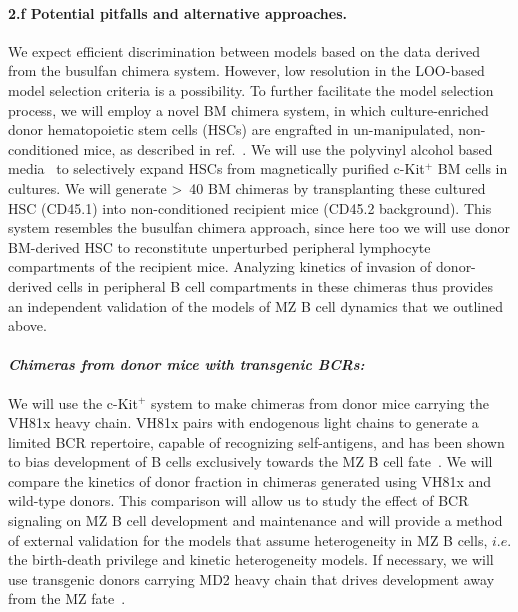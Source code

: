 \documentclass[11pt]{article}
\newcommand\ie{$\textit{i.e.}$}
\newcommand{\para}[1]{\vspace*{-4.5mm}\paragraph{#1}}
\begin{document}
\para{2.f Potential pitfalls and alternative approaches.}
We expect efficient discrimination between models based on the data derived from the busulfan chimera system.
However, low resolution in the LOO-based model selection criteria is a possibility.
To further facilitate the model selection process, we will employ a novel BM chimera system, in which culture-enriched donor hematopoietic stem cells (HSCs) are engrafted in un-manipulated, non-conditioned mice, as described in ref.~.
We will use the polyvinyl alcohol based media~\cite{Wilkinson_2020} to selectively expand HSCs from magnetically purified c-Kit$^+$ BM cells in cultures.
We will generate >~40 BM chimeras by transplanting these cultured HSC (CD45.1) into non-conditioned recipient mice (CD45.2 background).
This system resembles the busulfan chimera approach, since here too we will use donor BM-derived HSC to reconstitute {unperturbed peripheral lymphocyte compartments} of the recipient mice.
Analyzing kinetics of invasion of donor-derived cells in peripheral B cell compartments in these chimeras thus provides an {independent validation} of the models of MZ B cell dynamics that we outlined above.

\para{\textit{Chimeras from donor mice with transgenic BCRs:}}
We will use the c-Kit$^+$ system to make chimeras from donor mice carrying the VH81x heavy chain.
VH81x pairs with endogenous light chains to generate a limited BCR repertoire, capable of recognizing self-antigens, and has been shown to bias development of B cells exclusively towards the MZ B cell fate~\cite{Martin_2000, Hammad_2017}.
We will compare the kinetics of donor fraction in chimeras generated using VH81x and wild-type donors.
This comparison will allow us to study the effect of BCR signaling on MZ B cell development and maintenance and will provide a method of external validation for the models that assume heterogeneity in MZ B cells, {\ie} the birth-death privilege and kinetic heterogeneity models. %
If necessary, we will use transgenic donors carrying MD2 heavy chain that drives development away from the MZ fate~\cite{Martin_2000}.
\end{document}
